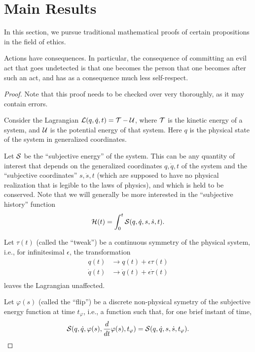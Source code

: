 \documentclass{article}
\begin{document}
\section{Main Results}

In this section, we pursue traditional mathematical proofs of certain
propositions in the field of ethics.

\begin{thm}
  Actions have consequences. In particular, the consequence of
  committing an evil act that goes undetected is that one becomes the
  person that one becomes after such an act, and has as a consequence
  much less self-respect.
\end{thm}

\begin{proof}
  Note that this proof needs to be checked over very thoroughly, as it
  may contain errors.

  Consider the Lagrangian ${\mathcal L}(q, \dot{q}, t) = {\mathcal T} - {\mathcal U}$, where
  ${\mathcal T}$ is the kinetic energy of a system, and ${\mathcal U}$ is the
  potential energy of that system. Here $q$ is the physical state of
  the system in generalized coordinates.

  Let ${\mathcal S}$ be the ``subjective energy'' of the system. This can be
  any quantity of interest that depends on the generalized coordinates
  $q, \dot{q}, t$ of the system and the ``subjective coordinates'' $s,
  \dot{s}, t$ (which are supposed to have no physical realization that
  is legible to the laws of physics), and which is held to be
  conserved. Note that we will generally be more interested in the
  ``subjective history'' function
  $${\mathcal H}(t) = \int_0^t {\mathcal S}(q, \dot{q}, s, \dot{s}, t).$$

  Let $\tau(t)$ (called the ``tweak'') be a continuous symmetry of the
  physical system, i.e., for infinitesimal $\epsilon$, the
  transformation
  \begin{align*}
    q(t) &\to q(t) + \epsilon \tau(t) \\
    \dot{q}(t) &\to \dot{q}(t) + \epsilon \dot{\tau}(t) \\
  \end{align*}
  leaves the Lagrangian unaffected.

  Let $\varphi(s)$ (called the ``flip'') be a discrete non-physical
  symetry of the subjective energy function at time $t_{\varphi}$,
  i.e., a function such that, for one brief instant of time,
  $${\mathcal S}(q, \dot{q}, \varphi(s), \frac{d}{dt} \varphi(s), t_{\varphi}) =
  {\mathcal S}(q, \dot{q}, s, \dot{s}, t_{\varphi}).$$


\end{proof}
\end{document}
